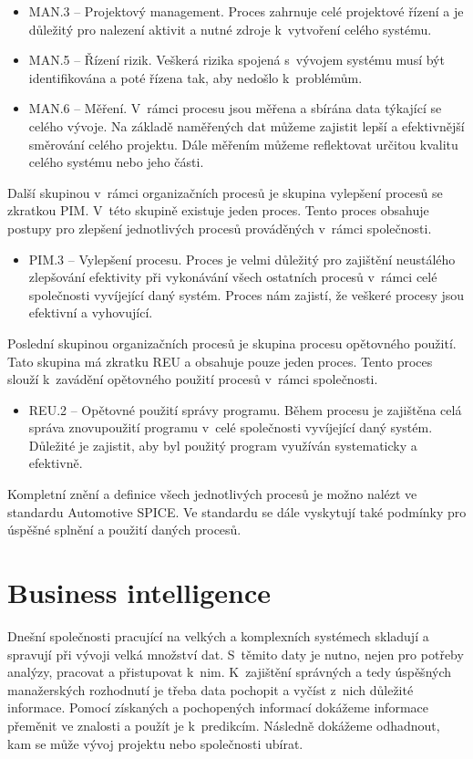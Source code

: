 \documentclass[czech,master]{diploma}
\begin{document}
\begin{itemize}
\item MAN.3 -- Projektový management. Proces zahrnuje celé projektové řízení a je důležitý pro nalezení aktivit a nutné zdroje k~vytvoření celého systému.
\item MAN.5 -- Řízení rizik. Veškerá rizika spojená s~vývojem systému musí být identifikována a poté řízena tak, aby nedošlo k~problémům.
\item MAN.6 -- Měření. V~rámci procesu jsou měřena a sbírána data týkající se celého vývoje. Na základě naměřených dat můžeme zajistit lepší a efektivnější směrování celého projektu. Dále měřením můžeme reflektovat určitou kvalitu celého systému nebo jeho části.
\end{itemize}

Další skupinou v~rámci organizačních procesů je skupina vylepšení procesů se zkratkou PIM. V~této skupině existuje jeden proces. Tento proces obsahuje postupy pro zlepšení jednotlivých procesů prováděných v~rámci společnosti.

\begin{itemize}
\item PIM.3 -- Vylepšení procesu. Proces je velmi důležitý pro zajištění neustálého zlepšování efektivity při vykonávání všech ostatních procesů v~rámci celé společnosti vyvíjející daný systém. Proces nám zajistí, že veškeré procesy jsou efektivní a vyhovující.
\end{itemize}

Poslední skupinou organizačních procesů je skupina procesu opětovného použití. Tato skupina má zkratku REU a obsahuje pouze jeden proces. Tento proces slouží k~zavádění opětovného použití procesů v~rámci společnosti.

\begin{itemize}
\item REU.2 -- Opětovné použití správy programu. Během procesu je zajištěna celá správa znovupoužití programu v~celé společnosti vyvíjející daný systém. Důležité je zajistit, aby byl použitý program využíván systematicky a efektivně.
\end{itemize}


Kompletní znění a definice všech jednotlivých procesů je možno nalézt ve standardu Automotive SPICE. \cite{ref:aspice_procesy} Ve standardu se dále vyskytují také podmínky pro úspěšné splnění a použití daných procesů.


\chapter{Business intelligence}
\label{sec:bi}
Dnešní společnosti pracující na velkých a komplexních systémech skladují a spravují při vývoji velká množství dat. S~těmito daty je nutno, nejen pro potřeby analýzy, pracovat a přistupovat k~nim. K~zajištění správných a tedy úspěšných manažerských rozhodnutí je třeba data pochopit a vyčíst z~nich důležité informace. Pomocí získaných a pochopených informací dokážeme informace přeměnit ve znalosti a použít je k~predikcím. Následně dokážeme odhadnout, kam se může vývoj projektu nebo společnosti ubírat.
\end{document}
